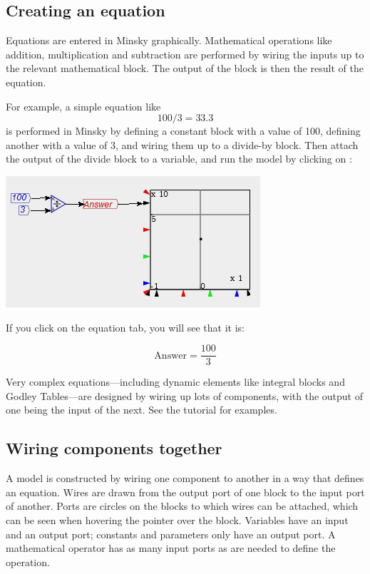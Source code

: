 \subsection{Creating an equation}

Equations are entered in Minsky graphically. Mathematical operations
like addition, multiplication and subtraction are performed by wiring
the inputs up to the relevant mathematical block. The output of the
block is then the result of the equation.

For example, a simple equation like 
\[
100/3=33.3
\]
is performed in Minsky by defining a constant block with a value of
100, defining another with a value of 3, and wiring them up to a divide-by
block. Then attach the output of the divide block to a variable, and
run the model by clicking on :
\begin{center}
\includegraphics{images/NewItem129} 
\par\end{center}

If you click on the equation tab, you will see that it is:

\[
\mathrm{Answer}=\frac{100}{3}
\]

Very complex equations---including dynamic elements like integral
blocks and Godley Tables---are designed by wiring up lots of components,
with the output of one being the input of the next. See the tutorial
for examples.

\subsection{Wiring components together}

A model is constructed by wiring one component to another in a way
that defines an equation. Wires are drawn from the output port of
one block to the input port of another. Ports are circles on the blocks
to which wires can be attached, which can be seen when hovering the
pointer over the block. Variables have an input and an output port;
constants and parameters only have an output port. A mathematical
operator has as many input ports as are needed to define the operation.

